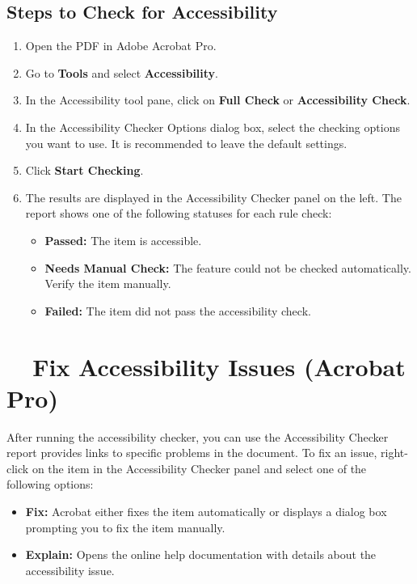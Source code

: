 \subsection{Steps to Check for Accessibility}\label{sub:steps-to-check-for-accessibility}\supercite{AdobeHelpX}

\begin{enumerate}
	\item Open the PDF in Adobe Acrobat Pro.
	\item Go to \textbf{Tools} and select \textbf{Accessibility}.
	\item In the Accessibility tool pane, click on \textbf{Full Check} or \textbf{Accessibility Check}.
	\item In the Accessibility Checker Options dialog box, select the checking options you want to use. It is recommended to leave the default settings.
	\item Click \textbf{Start Checking}.
	\item The results are displayed in the Accessibility Checker panel on the left. The report shows one of the following statuses for each rule check:
	      \begin{itemize}
		      \item \textbf{Passed:} The item is accessible.
		      \item \textbf{Needs Manual Check:} The feature could not be checked automatically. Verify the item manually.
		      \item \textbf{Failed:} The item did not pass the accessibility check.
	      \end{itemize}
\end{enumerate}

\section{~~Fix Accessibility Issues (Acrobat Pro)}
\label{sec:fix-accessibility-issues-acrobat-pro}

After running the accessibility checker, you can use the Accessibility Checker report provides links to specific problems in the document. To fix an issue, right-click on the item in the Accessibility Checker panel and select one of the following options:

\begin{itemize}
	\item \textbf{Fix:} Acrobat either fixes the item automatically or displays a dialog box prompting you to fix the item manually.
	\item \textbf{Explain:} Opens the online help documentation with details about the accessibility issue.
\end{itemize}

